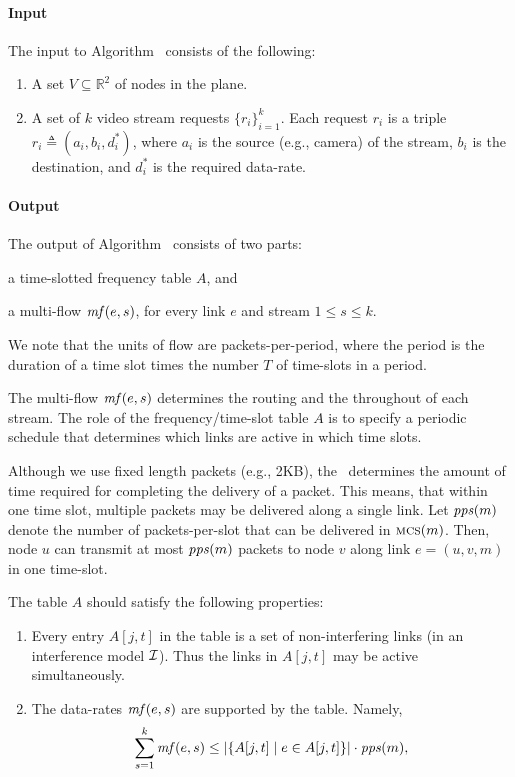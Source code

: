 \documentclass[12pt]{article}
\newenvironment{proof sketch}[1]{\noindent {\emph{Proof sketch of #1:}}}{\hfill \qed}
\newcommand{\eqdf}{\triangleq}
\newcommand{\Alg}{\text{\sc{alg-name}}}
\newcommand{\pps}{\text{\emph{pps}}}
\newcommand{\mf}{\text{\emph{mf}}}
\newcommand{\MCS}{\text{\sc{mcs}}}
\newcommand{\RR}{\mathbb{R}}
\newcommand{\Imodel}{$\cal{I}$}
\begin{document}
\paragraph{Input}
The input to Algorithm \Alg\ consists of the following:
\begin{enumerate}
\item A set $V\subseteq \RR^2$  of nodes in the plane.
\item A set of $k$ video stream requests $\{r_i\}_{i=1}^k$. Each
  request $r_i$ is a triple $r_i\eqdf (a_i,b_i,d^*_i)$, where $a_i$ is
  the source (e.g., camera) of the stream, $b_i$ is the destination,
  and $d^*_i$ is the required data-rate.
\end{enumerate}
\paragraph{Output}
\label{sec:output}
The output of Algorithm \Alg\ consists of two parts:
\begin{inparaenum}[(i)]
\item a time-slotted frequency table $A$, and
\item a multi-flow $\mf(e,s)$, for every link $e$ and stream $1\leq
  s\leq k$.
\end{inparaenum}
We note that the units of flow are packets-per-period, where the
period is the duration of a time slot times the number $T$ of
time-slots in a period.

The multi-flow $\mf(e,s)$ determines the routing and the throughout of
each stream. The role of the frequency/time-slot table $A$ is to
specify a periodic schedule that determines which links are active in
which time slots.

Although we use fixed length packets (e.g., 2KB), the
\MCS\ determines the amount of time required for completing the
delivery of a packet.  This means, that within one time slot, multiple
packets may be delivered along a single link.  Let $\pps(m)$ denote
the number of packets-per-slot that can be delivered in $\MCS(m)$.
Then, node $u$ can transmit at most $\pps(m)$ packets to node $v$
along link $e=(u,v,m)$ in one time-slot.

\medskip \noindent
The table $A$ should satisfy the following properties:
\begin{enumerate}
\item Every entry $A[j,t]$ in the table is a set of non-interfering
  links (in an interference model \Imodel). Thus the links in $A[j,t]$
  may be active simultaneously.
\item The data-rates $\mf(e,s)$ are supported by the table. Namely,
  \begin{align*}
    \sum_{s=1}^k \mf(e,s) \leq |\{A[j,t] \mid e\in A[j,t]\}|\cdot \pps(m),
  \end{align*}
\end{enumerate}
\end{document}
